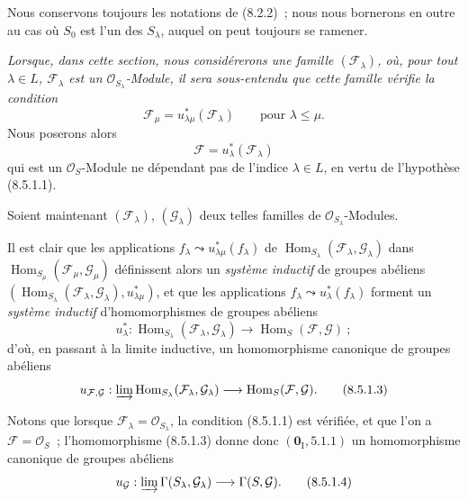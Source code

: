 \begin{env}[8.5.1]
\label{IV.8.5.1-fr}
Nous conservons toujours les notations de (8.2.2)~; nous nous bornerons en
outre au cas où $S_0$ est l'un des $S_\lambda$, auquel on peut toujours se
ramener.

\emph{Lorsque, dans cette section, nous considérerons une famille
$(\mathcal F_\lambda)$, où, pour tout $\lambda\in L$, $\mathcal F_\lambda$ est
un $\mathcal O_{S_\lambda}$-Module, il sera sous-entendu que cette famille
vérifie la condition}
\begin{equation}
  \mathcal F_\mu=u_{\lambda\mu}^*(\mathcal F_\lambda)
  \qquad\text{pour }\lambda\leq\mu.
  \tag{8.5.1.1}\label{IV.8.5.1.1-fr}
\end{equation}
Nous poserons alors
\begin{equation}
  \mathcal F=u_\lambda^*(\mathcal F_\lambda)
  \tag{8.5.1.2}\label{IV.8.5.1.2-fr}
\end{equation}
qui est un $\mathcal O_S$-Module ne dépendant pas de l'indice $\lambda\in L$,
en vertu de l'hypothèse (8.5.1.1).

Soient maintenant $(\mathcal F_\lambda)$, $(\mathcal G_\lambda)$ deux telles
familles de $\mathcal O_{S_\lambda}$-Modules.

Il est clair que les applications
$f_\lambda\leadsto u_{\lambda\mu}^*(f_\lambda)$ de
$\operatorname{Hom}_{S_\lambda}(\mathcal F_\lambda,\mathcal G_\lambda)$ dans
$\operatorname{Hom}_{S_\mu}(\mathcal F_\mu,\mathcal G_\mu)$ définissent alors
un \emph{système inductif} de groupes abéliens
$(\operatorname{Hom}_{S_\lambda}(\mathcal F_\lambda,\mathcal G_\lambda),
u_{\lambda\mu}^*)$, et que les applications
$f_\lambda\leadsto u_\lambda^*(f_\lambda)$ forment un \emph{système inductif}
d'homomorphismes de groupes abéliens
\[
  u_\lambda^*:\operatorname{Hom}_{S_\lambda}
  (\mathcal F_\lambda,\mathcal G_\lambda)
  \longrightarrow\operatorname{Hom}_S(\mathcal F,\mathcal G)~;
\]
d'où, en passant à la limite inductive, un homomorphisme canonique de groupes
abéliens
\begin{equation}
  u_{\mathcal F,\mathcal G}:
  \varinjlim\operatorname{Hom}_{S_\lambda}
  (\mathcal F_\lambda,\mathcal G_\lambda)
  \longrightarrow\operatorname{Hom}_S(\mathcal F,\mathcal G).
  \tag{8.5.1.3}\label{IV.8.5.1.3-fr}
\end{equation}

Notons que lorsque $\mathcal F_\lambda=\mathcal O_{S_\lambda}$, la condition
(8.5.1.1) est vérifiée, et que l'on a $\mathcal F=\mathcal O_S$~;
l'homomorphisme (8.5.1.3) donne donc $(\mathbf{0}_{\mathrm I},5.1.1)$ un homomorphisme
canonique de groupes abéliens
\begin{equation}
  u_{\mathcal G}:\varinjlim\Gamma(S_\lambda,\mathcal G_\lambda)
  \longrightarrow\Gamma(S,\mathcal G).
  \tag{8.5.1.4}\label{IV.8.5.1.4-fr}
\end{equation}
\end{env}

